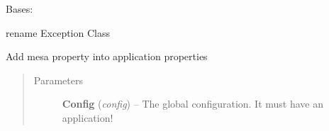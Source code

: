 \documentclass[a4paper,10pt,english]{sphinxmanual}
\begin{document}
\begin{fulllineitems}
\begin{fulllineitems}
\label{commands/apidoc/src:src.__init__.Path.rm}
\end{fulllineitems}


\begin{fulllineitems}
\label{commands/apidoc/src:src.__init__.Path.smartcopy}
\end{fulllineitems}


\begin{fulllineitems}
\label{commands/apidoc/src:src.__init__.Path.symlink}
\end{fulllineitems}


\end{fulllineitems}


\begin{fulllineitems}
\label{commands/apidoc/src:src.__init__.SatException}
Bases: 

rename Exception Class

\end{fulllineitems}


\begin{fulllineitems}
\label{commands/apidoc/src:src.__init__.activate_mesa_property}
Add mesa property into application properties
\begin{quote}\begin{description}
\item[{Parameters}] \leavevmode
\textbf{Config} (\emph{config}) -- The global configuration. It must have an application!

\end{description}\end{quote}

\end{fulllineitems}

\end{document}
